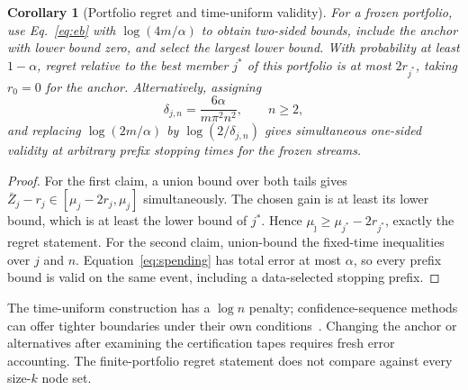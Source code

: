 \documentclass[preprint,11pt,sort&compress]{elsarticle}
\newtheorem{corollary}[theorem]{Corollary}
\begin{document}
\begin{corollary}[Portfolio regret and time-uniform validity]
\label{cor:portfolio}
For a frozen portfolio, use Eq.~\ref{eq:eb} with $\log(4m/\alpha)$ to obtain two-sided bounds, include the anchor with lower bound zero, and select the largest lower bound. With probability at least $1-\alpha$, regret relative to the best member $j^*$ of this portfolio is at most $2r_{j^*}$, taking $r_0=0$ for the anchor. Alternatively, assigning
\begin{equation}
 \delta_{j,n}=\frac{6\alpha}{m\pi^2n^2},\qquad n\ge2,\label{eq:spending}
\end{equation}
and replacing $\log(2m/\alpha)$ by $\log(2/\delta_{j,n})$ gives simultaneous one-sided validity at arbitrary prefix stopping times for the frozen streams.
\end{corollary}
\begin{proof}
For the first claim, a union bound over both tails gives $\bar Z_j-r_j\in[\mu_j-2r_j,\mu_j]$ simultaneously. The chosen gain is at least its lower bound, which is at least the lower bound of $j^*$. Hence $\mu_{\widehat\jmath}\ge\mu_{j^*}-2r_{j^*}$, exactly the regret statement. For the second claim, union-bound the fixed-time inequalities over $j$ and $n$. Equation~\ref{eq:spending} has total error at most $\alpha$, so every prefix bound is valid on the same event, including a data-selected stopping prefix.
\end{proof}

The time-uniform construction has a $\log n$ penalty; confidence-sequence methods can offer tighter boundaries under their own conditions~\cite{howard2021,waudby2024}. Changing the anchor or alternatives after examining the certification tapes requires fresh error accounting. The finite-portfolio regret statement does not compare against every size-$k$ node set.
\end{document}
